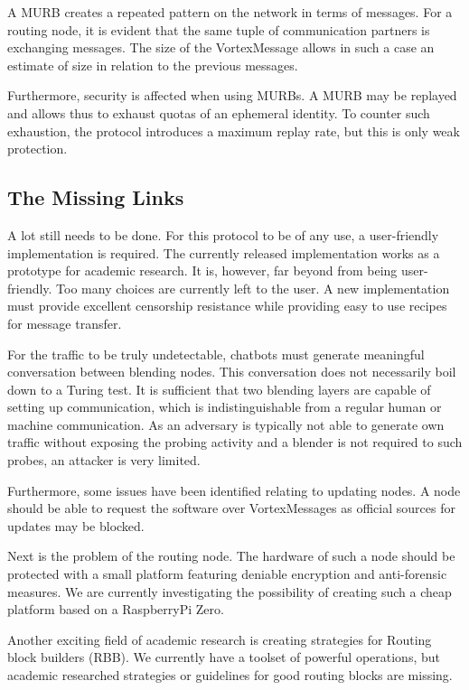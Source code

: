 \documentclass[10pt,journal,compsoc]{IEEEtran}
\begin{document}
A MURB creates a repeated pattern on the network in terms of messages. For a routing node, it is evident that the same tuple of communication partners is exchanging messages. The size of the VortexMessage allows in such a case an estimate of size in relation to the previous messages.

Furthermore, security is affected when using MURBs. A MURB may be replayed and allows thus to exhaust quotas of an ephemeral identity. To counter such exhaustion, the protocol introduces a maximum replay rate, but this is only weak protection.

\subsection{The Missing Links}
A lot still needs to be done. For this protocol to be of any use, a user-friendly implementation is required. The currently released implementation works as a prototype for academic research. It is, however, far beyond from being user-friendly. Too many choices are currently left to the user. A new implementation must provide excellent censorship resistance while providing easy to use recipes for message transfer.  

For the traffic to be truly undetectable, chatbots must generate meaningful conversation between blending nodes. This conversation does not necessarily boil down to a Turing test. It is sufficient that two blending layers are capable of setting up communication, which is indistinguishable from a regular human or machine communication. As an adversary is typically not able to generate own traffic without exposing the probing activity and a blender is not required to such probes, an attacker is very limited.

Furthermore, some issues have been identified relating to updating nodes. A node should be able to request the software over VortexMessages as official sources for updates may be blocked. 

Next is the problem of the routing node. The hardware of such a node should be protected with a small platform featuring deniable encryption and anti-forensic measures. We are currently investigating the possibility of creating such a cheap platform based on a RaspberryPi Zero.

Another exciting field of academic research is creating strategies for Routing block builders (RBB). We currently have a toolset of powerful operations, but academic researched strategies or guidelines for good routing blocks are missing. 
\end{document}
